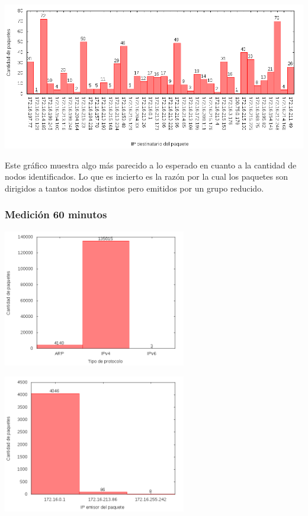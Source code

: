 \begin{center}
\includegraphics[width=16cm]{../mediciones/altop-wifi-10/altop10IpsDstArp.png}
\end{center}

Este gráfico muestra algo más parecido a lo esperado en cuanto a la cantidad de nodos identificados. Lo que es incierto es la razón por la cual
los paquetes son dirigidos a tantos nodos distintos pero emitidos por un grupo reducido.

\subsubsection{Medición 60 minutos}

\begin{center}
\includegraphics[width=8cm]{../mediciones/altop-wifi-60/altop60Protocolos.png}
\end{center}

\begin{center}
\includegraphics[width=8cm]{../mediciones/altop-wifi-60/altop60IpsSrcArp.png}
\end{center}

